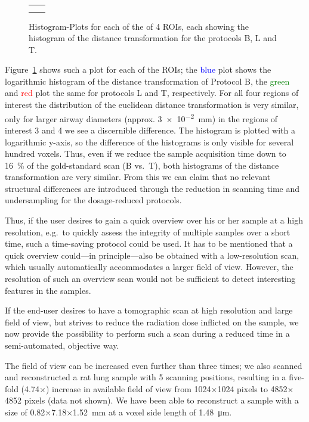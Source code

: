 \renewcommand{\imsize}{.309\columnwidth}
\begin{figure}%
	\centering
	\caption{Histogram-Plots for each of the of 4 ROIs, each showing the histogram of the distance transformation for the protocols B, L and T.}%
	\begin{tabular}{cc}%
		&%
		\\%
		&%
	\end{tabular}%
	\label{fig:DTFplots}%
\end{figure}

Figure~\ref{fig:DTFplots} shows such a plot for each of the ROIs; the \textcolor{blue}{blue} plot shows the logarithmic histogram of the distance transformation of Protocol B, the \textcolor{green}{green} and \textcolor{red}{red} plot the same for protocols L and T, respectively. For all four regions of interest the distribution of the euclidean distance transformation is very similar, only for larger airway diameters (approx. \SI{3e-2}{\milli\meter}) in the regions of interest 3 and 4 we see a discernible difference. The histogram is plotted with a logarithmic y-axis, so the difference of the histograms is only visible for several hundred voxels. Thus, even if we reduce the sample acquisition time down to \SI{16}{\percent} of the gold-standard scan (B vs.\ T), both histograms of the distance transformation are very similar. From this we can claim that no relevant structural differences are introduced through the reduction in scanning time and undersampling for the dosage-reduced protocols.

Thus, if the user desires to gain a quick overview over his or her sample at a high resolution, e.g.\ to quickly assess the integrity of multiple samples over a short time, such a time-saving protocol could be used. It has to be mentioned that a quick overview could---in principle---also be obtained with a low-resolution scan, which usually automatically accommodates a larger field of view. However, the resolution of such an overview scan would not be sufficient to detect interesting features in the samples.

If the end-user desires to have a tomographic scan at high resolution and large field of view, but strives to reduce the radiation dose inflicted on the sample, we now provide the possibility to perform such a scan during a reduced time in a semi-automated, objective way.

The field of view can be increased even further than three times; we also scanned and reconstructed a rat lung sample with 5 scanning positions, resulting in a five-fold (4.74$\times$) increase in available field of view from 1024$\times$1024 pixels to 4852$\times$4852 pixels (data not shown). We have been able to reconstruct a sample with a size of 0.82$\times$7.18$\times$\SI{1.52}{\milli\meter} %
at a voxel side length of \SI{1.48}{\micro\meter}.